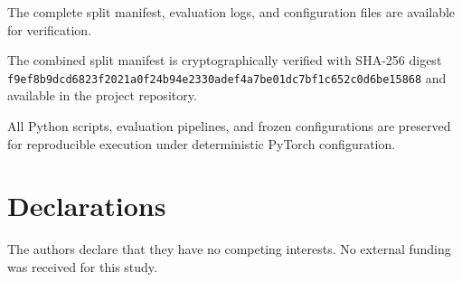 \documentclass[pdflatex,sn-mathphys-num]{sn-jnl}
\theoremstyle{thmstyleone}%
\theoremstyle{thmstyletwo}%
\theoremstyle{thmstylethree}%
\begin{document}
\backmatter

The complete split manifest, evaluation logs, and configuration files are available for verification.

The combined split manifest is cryptographically verified with SHA-256 digest \texttt{f9ef8b9dcd6823f2021a0f24b94e2330adef4a7be01dc7bf1c652c0d6be15868} and available in the project repository.

All Python scripts, evaluation pipelines, and frozen configurations are preserved for reproducible execution under deterministic PyTorch configuration.

\section*{Declarations}
The authors declare that they have no competing interests. No external funding was received for this study.

\end{document}
